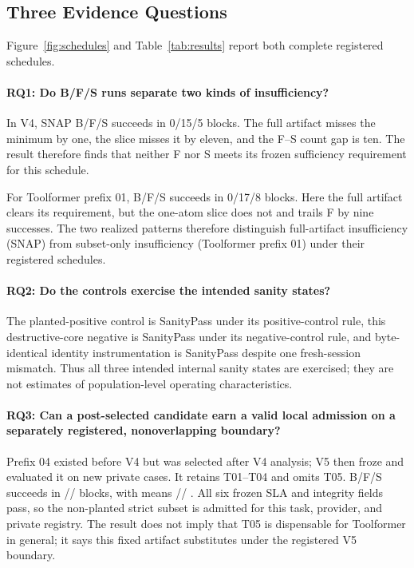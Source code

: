 \documentclass[letterpaper]{article} %
\begin{document}
\subsection{Three Evidence Questions}

Figure~\ref{fig:schedules} and Table~\ref{tab:results} report both complete
registered schedules.

\paragraph{RQ1: Do B/F/S runs separate two kinds of insufficiency?}
In V4, SNAP B/F/S succeeds in 0/15/5 blocks.  The full artifact misses the
minimum by one, the slice misses it by eleven, and the F--S count gap is ten.
The result therefore finds that neither F nor S meets its frozen sufficiency
requirement for this schedule.

For Toolformer prefix 01, B/F/S succeeds in 0/17/8 blocks.  Here the full
artifact clears its requirement, but the one-atom slice does not and trails F by
nine successes.  The two realized patterns therefore distinguish full-artifact
insufficiency (SNAP) from subset-only insufficiency (Toolformer prefix 01) under
their registered schedules.

\paragraph{RQ2: Do the controls exercise the intended sanity states?}
The planted-positive control is
SanityPass under its positive-control rule, this destructive-core negative is
SanityPass under its negative-control rule, and byte-identical identity
instrumentation is SanityPass despite one fresh-session mismatch.  Thus all three intended
internal sanity states are exercised; they are not estimates of population-level
operating characteristics.

\paragraph{RQ3: Can a post-selected candidate earn a valid local admission on a separately registered, nonoverlapping boundary?}
Prefix 04 existed before V4 but was selected after V4 analysis; V5 then froze
and evaluated it on new private cases.  It retains T01--T04 and omits T05.  B/F/S
succeeds in \ToolformerNaturalBSuccesses{}/\ToolformerNaturalFSuccesses{}/
\ToolformerNaturalSSuccesses{} blocks, with means
\ToolformerNaturalBMeanScore{}/\ToolformerNaturalFMeanScore{}/
\ToolformerNaturalSMeanScore{}.  All six frozen SLA and integrity fields pass, so
the non-planted strict subset is admitted for this task, provider, and private
registry.  The result does not imply that T05 is dispensable for Toolformer in
general; it says this fixed artifact substitutes under the registered V5 boundary.
\end{document}
